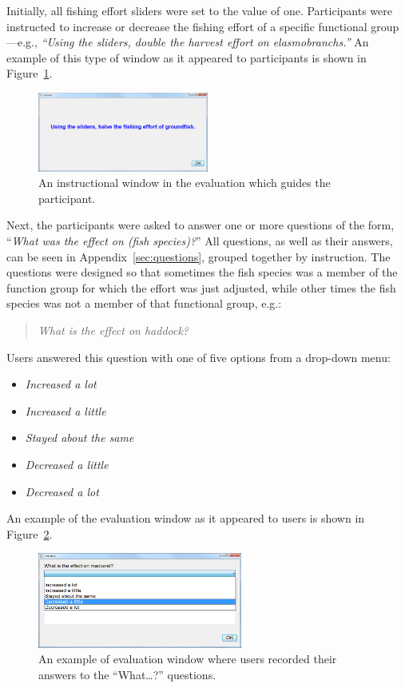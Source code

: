 Initially, all fishing effort sliders were set to the value of one.  Participants were  instructed to increase or decrease the fishing effort of a specific functional group---e.g., \textit{``Using the sliders, double the harvest effort on elasmobranchs.''}  An example of this type of window as it appeared to participants is shown in Figure~\ref{fig:eval_inst}.

\begin{figure}[h]
	\centering
	\includegraphics[width=0.5\textwidth]{figures/png/eval_instr.png}
	\caption{An instructional window in the evaluation which guides the participant.}
	\label{fig:eval_inst}
\end{figure}

Next, the participants were asked to answer one or more questions of the form, ``\textit{What was the effect on (fish species)?}''  All questions, as well as their answers, can be seen in Appendix~\ref{sec:questions}, grouped together by instruction.  The questions were designed so that sometimes the fish species was a member of the function group for which the effort was just adjusted, while other times the fish species was not a member of that functional group, e.g.:
\begin{quote}
\textit{What is the effect on haddock?}
\end{quote}
Users answered this question with one of five options from a drop-down menu:
\begin{itemize}
\item \textit{Increased a lot}
\item \textit{Increased a little}
\item \textit{Stayed about the same}
\item \textit{Decreased a little}
\item \textit{Decreased a lot}
\end{itemize}
An example of the evaluation window as it appeared to users is shown in Figure~\ref{fig:eval_what}.

\begin{figure}[h]
	\centering
	\includegraphics[width=0.6\textwidth]{figures/png/eval_what.png}
	\caption{An example of evaluation window where users recorded their answers to the ``What\ldots?'' questions.}
	\label{fig:eval_what}
\end{figure}

